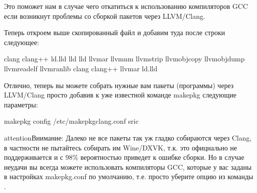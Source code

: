 \documentclass[letterpaper,10pt,russian,openany]{sphinxmanual}
\begin{document}
\sphinxAtStartPar
Это поможет нам в случае чего откатиться к использованию компиляторов GCC если возникнут проблемы со сборкой пакетов через LLVM/Clang.

\sphinxAtStartPar
Теперь откроем выше скопированный файл и добавим туда после строки  следующее:

\begin{sphinxVerbatim}[commandchars=\\\{\}]
 clang
 clang++
 ld.lld
 lld
 lld
 llvm\PYGZhy{}ar
 llvm\PYGZhy{}nm
 llvm\PYGZhy{}strip
 llvm\PYGZhy{}objcopy
 llvm\PYGZhy{}objdump
 llvm\PYGZhy{}readelf
 llvm\PYGZhy{}ranlib
 clang
 clang++
 llvm\PYGZhy{}ar
 ld.lld
\end{sphinxVerbatim}

\sphinxAtStartPar
Отлично, теперь вы можете собрать нужные вам пакеты (программы) через LLVM/Clang просто добавив к уже известной команде makepkg следующие параметры:

\begin{sphinxVerbatim}[commandchars=\\\{\}]
makepkg \PYGZhy{}\PYGZhy{}config /etc/makepkg\PYGZhy{}clang.conf \PYGZhy{}sric
\end{sphinxVerbatim}

\begin{sphinxadmonition}{attention}{Внимание:}
\sphinxAtStartPar
Далеко не все пакеты так уж гладко собираются через Clang, в частности не пытайтесь собирать им Wine/DXVK,
т.к. это официально не поддерживается и с 98\% вероятностью приведет к ошибке сборки.
Но в случае неудачи вы всегда можете использовать компиляторы GCC, которые у вас заданы в настройках makepkg.conf по умолчанию,
т.е. просто уберите опцию  из команды .
\end{sphinxadmonition}
\end{document}
